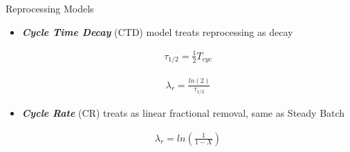 \documentclass[final]{beamer}
\newlength{\onecolwid}
\newlength{\threecolwid}
\begin{document}
\begin{frame}[t]
\begin{columns}[t,totalwidth=\threecolwid]
\begin{column}{\onecolwid}
\begin{block}{Reprocessing Models}
\begin{itemize}
\begin{align}	
\frac{dN_j}{dt}_{net} = \frac{dN_j}{dt}_{base} -  \lambda_{r, j} N_j + \sum_{mat} \lambda _{r, i \rightarrow j} N_i
\end{align}


The symbols given in the equations are defined as follows:
\begin{itemize}
\item $N_j$ is the atomic density of isotope j.
\item $\gamma_{i \rightarrow j}$ is the fractional fission product yield of $j$ in the fission of isotope $i$.
\item $\sigma_{f, i}$ is the microscopic fission cross section of isotope $i$.
\item $\Phi$ is the spectrum-averaged scalar flux in the fuel region.
\item $\lambda _{i \rightarrow j}$ is the decay constant of decay $i \rightarrow j$.
\item $\sigma_{i \rightarrow j}$ is the microscopic transmution cross section of reaction $i \rightarrow j$.
\item $N_i$ is the atomic density of isotope $i$.
\item $\lambda_j$ is the decay constant of isotope $j$.
\item $\lambda_{r, j}$ is the reprocessing constant for removal of isotope $j$.
\item $\sigma_j$ is the microscopic total transmutation cross section of isotope $j$.
\item $\lambda _{r, i \rightarrow j}$ is the reprocessing constant for feed of material $i \rightarrow j$.
\end{itemize}


	\item \textbf{\emph{Cycle Time Decay}} (CTD) model treats reprocessing as decay


\begin{align}
	\tau_{1/2} = \frac{1}{2} T_{cyc}
\end{align}

\begin{align}
	\lambda_r = \frac{ln(2)}{\tau_{1/2}}
\end{align}

	\item \textbf{\emph{Cycle Rate}} (CR) treats as linear fractional removal, same as Steady Batch

\begin{align}
	\lambda_r = ln \left( \frac{1}{1-X} \right)
\end{align}



\end{itemize}
\end{block}
\end{column}
\end{columns}
\end{frame}
\end{document}
